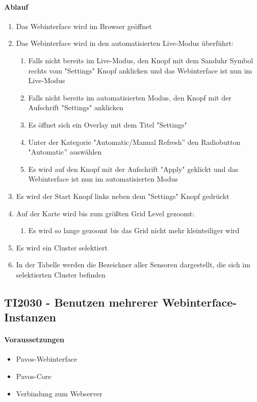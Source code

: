 \paragraph{Ablauf}
\begin{enumerate}
\item Das Webinterface wird im Browser geöffnet
\item Das Webinterface wird in den automatisierten Live-Modus überführt:
\begin{enumerate}
\item Falls nicht bereits im Live-Modus, den Knopf mit dem Sanduhr Symbol rechts vom "Settings" Knopf anklicken und das Webinterface ist nun im Live-Modus
\item Falls nicht bereits im automatisierten Modus, den Knopf mit der Aufschrift "Settings" anklicken
\item Es öffnet sich ein Overlay mit dem Titel "Settings"
\item Unter der Kategorie "Automatic/Manual Refresh'' den Radiobutton "Automatic'' auswählen
\item Es wird auf den Knopf mit der Aufschrift "Apply" geklickt und das Webinterface ist nun im automatisierten Modus
\end{enumerate}
\item Es wird der Start Knopf links neben dem "Settings" Knopf gedrückt
\item Auf der Karte wird bis zum größten Grid Level gezoomt:
\begin{enumerate}
\item Es wird so lange gezoomt bis das Grid nicht mehr kleinteiliger wird
\end{enumerate}
\item Es wird ein Cluster selektiert
\item In der Tabelle werden die Bezeichner aller Sensoren dargestellt, die sich im selektierten Cluster befinden
\end{enumerate}
\szenarioOk

\subsection{TI2030 - Benutzen mehrerer Webinterface-Instanzen}
\paragraph{Voraussetzungen}
\begin{itemize}
\item Pavos-Webinterface
\item Pavos-Core
\item Verbindung zum Webserver
\end{itemize}
